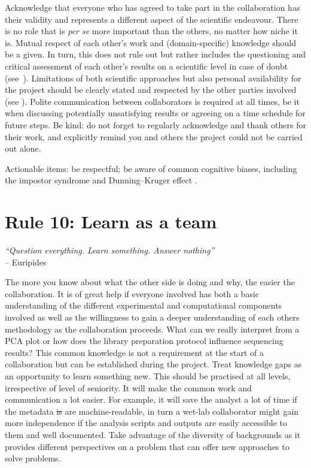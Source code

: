 \documentclass{article}
\begin{document}
Acknowledge that everyone who has agreed to take part in the collaboration has their validity and represents a different aspect of the scientific endeavour. There is no role that is \textit{per se} more important than the others, no matter how niche it is. Mutual respect of each other’s work and (domain-specific) knowledge should be a given. In turn, this does not rule out but rather includes the questioning and critical assessment of each other's results on a scientific level in case of doubt (see~). Limitations of both scientific approaches but also personal availability for the project should be clearly stated and respected by the other parties involved (see ). Polite communication between collaborators is required at all times, be it when discussing potentially unsatisfying results or agreeing on a time schedule for future steps. Be kind: do not forget to regularly acknowledge and thank others for their work, and explicitly remind you and others the project could not be carried out alone.

Actionable items: be respectful; be aware of common cognitive biases, including the impostor syndrome \cite{clance1978imposter} and Dunning–Kruger effect \cite{kruger1999unskilled}.

\section*{Rule 10: Learn as a team} %
\label{rule10_learn}

\begin{flushright}
\rightskip=1cm\textit{``Question everything. Learn something. Answer nothing''} \\
\vspace{.2em}
\rightskip=0cm -- Euripides 
\end{flushright}

The more you know about what the other side is doing and why, the easier the collaboration. It is of great help if everyone involved has both a basic understanding of the different experimental and computational components involved as well as the willingness to gain a deeper understanding of each others methodology as the collaboration proceeds. What can we really interpret from a PCA plot or how does the library preparation protocol influence sequencing results? This common knowledge is not a requirement at the start of a collaboration but can be established during the project. Treat knowledge gaps as an opportunity to learn something new. This should be practised at all levels, irrespective of level of seniority. It will make the common work and communication a lot easier. For example, it will save the analyst a lot of time if the metadata {\color{red} \sout{is} are} machine-readable, in turn a wet-lab collaborator might gain more independence if the analysis scripts and outputs are easily accessible to them and well documented. Take advantage of the diversity of backgrounds as it provides different perspectives on a problem that can offer new approaches to solve problems.
\end{document}
